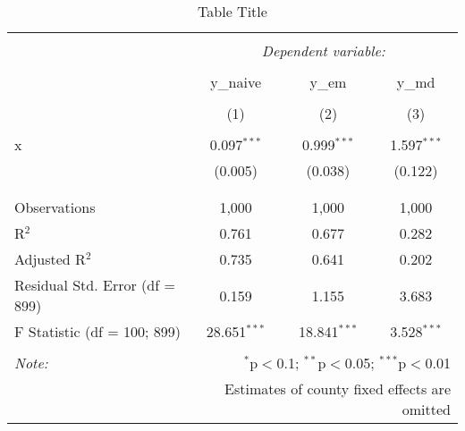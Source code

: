 
\begin{table}[!htbp] \centering 
  \caption{Table Title} 
  \label{} 
\begin{tabular}{@{\extracolsep{5pt}}lccc} 
\\[-1.8ex]\hline 
\hline \\[-1.8ex] 
 & \multicolumn{3}{c}{\textit{Dependent variable:}} \\ 
\cline{2-4} 
\\[-1.8ex] & y\_naive & y\_em & y\_md \\ 
\\[-1.8ex] & (1) & (2) & (3)\\ 
\hline \\[-1.8ex] 
 x & 0.097$^{***}$ & 0.999$^{***}$ & 1.597$^{***}$ \\ 
  & (0.005) & (0.038) & (0.122) \\ 
  & & & \\ 
\hline \\[-1.8ex] 
Observations & 1,000 & 1,000 & 1,000 \\ 
R$^{2}$ & 0.761 & 0.677 & 0.282 \\ 
Adjusted R$^{2}$ & 0.735 & 0.641 & 0.202 \\ 
Residual Std. Error (df = 899) & 0.159 & 1.155 & 3.683 \\ 
F Statistic (df = 100; 899) & 28.651$^{***}$ & 18.841$^{***}$ & 3.528$^{***}$ \\ 
\hline 
\hline \\[-1.8ex] 
\textit{Note:}  & \multicolumn{3}{r}{$^{*}$p$<$0.1; $^{**}$p$<$0.05; $^{***}$p$<$0.01} \\ 
 & \multicolumn{3}{r}{Estimates of county fixed effects are omitted} \\ 
\end{tabular} 
\end{table} 
